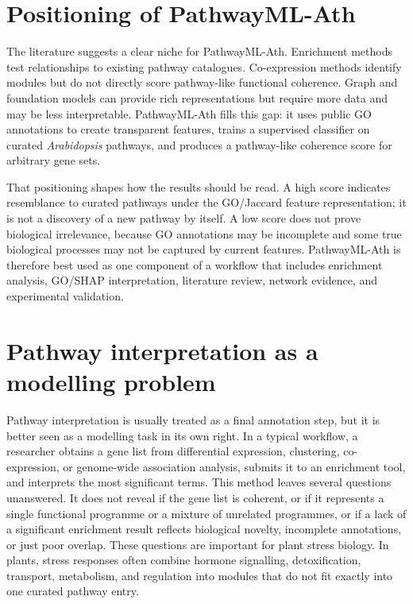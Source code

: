 \documentclass[12pt,letterpaper,oneside,openany]{book}
\begin{document}
\section{Positioning of PathwayML-Ath}
\label{sec:lit_positioning}

The literature suggests a clear niche for PathwayML-Ath. Enrichment methods test relationships to existing pathway catalogues. Co-expression methods identify modules but do not directly score pathway-like functional coherence. Graph and foundation models can provide rich representations but require more data and may be less interpretable. PathwayML-Ath fills this gap: it uses public GO annotations to create transparent features, trains a supervised classifier on curated \textit{Arabidopsis} pathways, and produces a pathway-like coherence score for arbitrary gene sets.

That positioning shapes how the results should be read. A high score indicates resemblance to curated pathways under the GO/Jaccard feature representation; it is not a discovery of a new pathway by itself. A low score does not prove biological irrelevance, because GO annotations may be incomplete and some true biological processes may not be captured by current features. PathwayML-Ath is therefore best used as one component of a workflow that includes enrichment analysis, GO/SHAP interpretation, literature review, network evidence, and experimental validation.




\section{Pathway interpretation as a modelling problem}
\label{sec:bg_why_thesis}

Pathway interpretation is usually treated as a final annotation step, but it is better seen as a modelling task in its own right. In a typical workflow, a researcher obtains a gene list from differential expression, clustering, co-expression, or genome-wide association analysis, submits it to an enrichment tool, and interprets the most significant terms. This method leaves several questions unanswered. It does not reveal if the gene list is coherent, or if it represents a single functional programme or a mixture of unrelated programmes, or if a lack of a significant enrichment result reflects biological novelty, incomplete annotations, or just poor overlap. These questions are important for plant stress biology. In plants, stress responses often combine hormone signalling, detoxification, transport, metabolism, and regulation into modules that do not fit exactly into one curated pathway entry.
\end{document}
